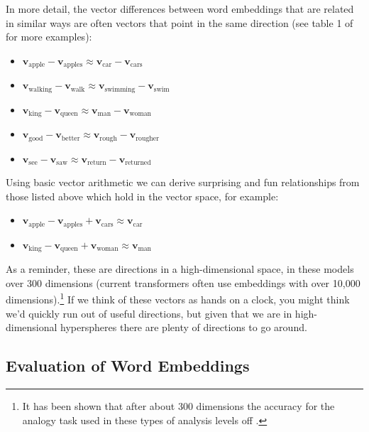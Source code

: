 In more detail, the vector differences between word embeddings that are related in similar ways are often vectors that point in the same direction (see table 1 of \cite{mikolov2013linguistic} for more examples):

\begin{itemize}
  \item $\textbf{v}_\text{apple} - \textbf{v}_\text{apples} \approx \textbf{v}_\text{car} - \textbf{v}_\text{cars}$
  \item $\textbf{v}_\text{walking} - \textbf{v}_\text{walk} \approx \textbf{v}_\text{swimming} - \textbf{v}_\text{swim}$
  \item $\textbf{v}_\text{king} - \textbf{v}_\text{queen} \approx \textbf{v}_\text{man} - \textbf{v}_\text{woman}$
  \item $\textbf{v}_\text{good} - \textbf{v}_\text{better} \approx \textbf{v}_\text{rough} - \textbf{v}_\text{rougher}$
  \item $\textbf{v}_\text{see} - \textbf{v}_\text{saw} \approx \textbf{v}_\text{return} - \textbf{v}_\text{returned}$
\end{itemize}

Using basic vector arithmetic we can derive surprising and fun relationships from those listed above which hold in the vector space, for example:

\begin{itemize}
  \item $\textbf{v}_\text{apple} - \textbf{v}_\text{apples} + \textbf{v}_\text{cars} \approx \textbf{v}_\text{car} $
  \item $\textbf{v}_\text{king} - \textbf{v}_\text{queen} + \textbf{v}_\text{woman} \approx  \textbf{v}_\text{man}$
\end{itemize}

As a reminder, these are directions in a high-dimensional space, in these models over 300 dimensions (current transformers often use embeddings with over 10,000 dimensions).\footnote{It has been shown that after about 300 dimensions the accuracy for the analogy task used in these types of analysis levels off \cite{pennington2014glove}.}  If we think of these vectors as hands on a clock, you might think we'd quickly run out of useful directions, but given that we are in high-dimensional hyperspheres there are plenty of directions to go around.


\subsection{Evaluation of Word Embeddings}

